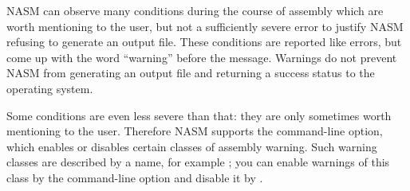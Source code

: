 
NASM can observe many conditions during the course of assembly which
are worth mentioning to the user, but not a sufficiently severe
error to justify NASM refusing to generate an output file. These
conditions are reported like errors, but come up with the word
``warning'' before the message. Warnings do not prevent NASM from
generating an output file and returning a success status to the
operating system.

Some conditions are even less severe than that: they are only
sometimes worth mentioning to the user. Therefore NASM supports the
 command-line option, which enables or disables certain
classes of assembly warning. Such warning classes are described by a
name, for example ; you can enable warnings of
this class by the command-line option  and
disable it by .


